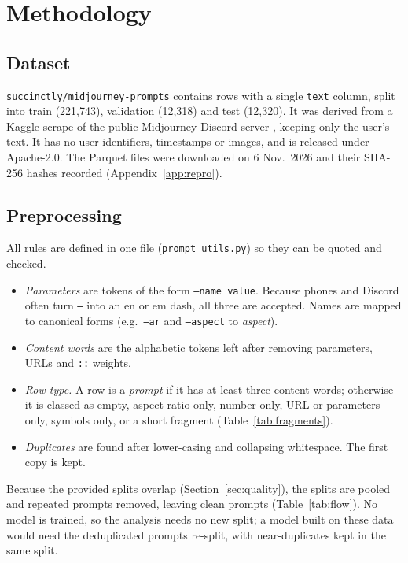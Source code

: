 \documentclass[conference]{IEEEtran}
\begin{document}
\section{Methodology}

\subsection{Dataset}
\texttt{succinctly/midjourney-prompts} \cite{succinctlyMidjourneyPrompts2022}
contains \NRaw{} rows with a single \texttt{text} column, split into train
(221,743), validation (12,318) and test (12,320). It was derived from a
Kaggle scrape of the public Midjourney Discord server
\cite{kaggleMidjourney250k}, keeping only the user's text. It has no user
identifiers, timestamps or images, and is released under Apache-2.0. The Parquet files were downloaded on 6 Nov.\ 2026 and their SHA-256 hashes
recorded (Appendix~\ref{app:repro}).

\subsection{Preprocessing}
All rules are defined in one file (\texttt{prompt\_utils.py}) so they can be
quoted and checked.
\begin{itemize}
  \item \textit{Parameters} are tokens of the form \texttt{--name value}.
        Because phones and Discord often turn \texttt{--} into an en or em
        dash, all three are accepted. Names are mapped to canonical forms
        (e.g.\ \texttt{--ar} and \texttt{--aspect} to \textit{aspect}).
  \item \textit{Content words} are the alphabetic tokens left after
        removing parameters, URLs and \texttt{::} weights.
  \item \textit{Row type.} A row is a \textit{prompt} if it has at least
        three content words; otherwise it is classed as empty, aspect ratio
        only, number only, URL or parameters only, symbols only, or a short
        fragment (Table~\ref{tab:fragments}).
  \item \textit{Duplicates} are found after lower-casing and collapsing
        whitespace. The first copy is kept.
\end{itemize}
Because the provided splits overlap (Section~\ref{sec:quality}), the splits are pooled and repeated prompts removed, leaving \NCleanPrompts{} clean prompts (Table~\ref{tab:flow}). No model is
trained, so the analysis needs no new split; a model built on these data
would need the deduplicated prompts re-split, with near-duplicates kept
in the same split.
\end{document}
